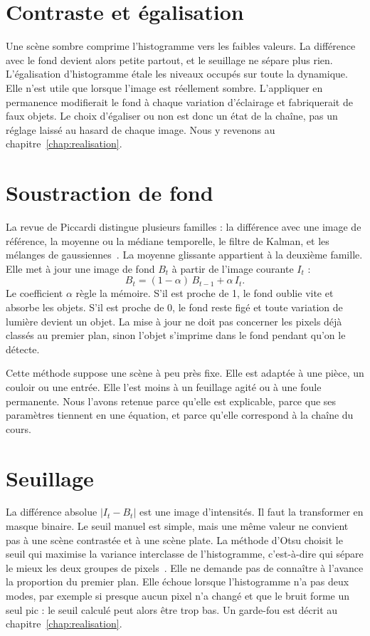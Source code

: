 \section{Contraste et égalisation}

Une scène sombre comprime l'histogramme vers les faibles valeurs. La différence avec le fond devient alors petite partout, et le seuillage ne sépare plus rien. L'égalisation d'histogramme étale les niveaux occupés sur toute la dynamique. Elle n'est utile que lorsque l'image est réellement sombre. L'appliquer en permanence modifierait le fond à chaque variation d'éclairage et fabriquerait de faux objets. Le choix d'égaliser ou non est donc un état de la chaîne, pas un réglage laissé au hasard de chaque image. Nous y revenons au chapitre~\ref{chap:realisation}.

\section{Soustraction de fond}

La revue de Piccardi distingue plusieurs familles : la différence avec une image de référence, la moyenne ou la médiane temporelle, le filtre de Kalman, et les mélanges de gaussiennes~\cite{piccardi}. La moyenne glissante appartient à la deuxième famille. Elle met à jour une image de fond $B_t$ à partir de l'image courante $I_t$ :
\begin{equation}
  B_t = (1-\alpha)\,B_{t-1} + \alpha\,I_t .
  \label{eq:fond}
\end{equation}
Le coefficient $\alpha$ règle la mémoire. S'il est proche de 1, le fond oublie vite et absorbe les objets. S'il est proche de 0, le fond reste figé et toute variation de lumière devient un objet. La mise à jour ne doit pas concerner les pixels déjà classés au premier plan, sinon l'objet s'imprime dans le fond pendant qu'on le détecte.

Cette méthode suppose une scène à peu près fixe. Elle est adaptée à une pièce, un couloir ou une entrée. Elle l'est moins à un feuillage agité ou à une foule permanente. Nous l'avons retenue parce qu'elle est explicable, parce que ses paramètres tiennent en une équation, et parce qu'elle correspond à la chaîne du cours.

\section{Seuillage}

La différence absolue $|I_t - B_t|$ est une image d'intensités. Il faut la transformer en masque binaire. Le seuil manuel est simple, mais une même valeur ne convient pas à une scène contrastée et à une scène plate. La méthode d'Otsu choisit le seuil qui maximise la variance interclasse de l'histogramme, c'est-à-dire qui sépare le mieux les deux groupes de pixels~\cite{otsu}. Elle ne demande pas de connaître à l'avance la proportion du premier plan. Elle échoue lorsque l'histogramme n'a pas deux modes, par exemple si presque aucun pixel n'a changé et que le bruit forme un seul pic : le seuil calculé peut alors être trop bas. Un garde-fou est décrit au chapitre~\ref{chap:realisation}.

